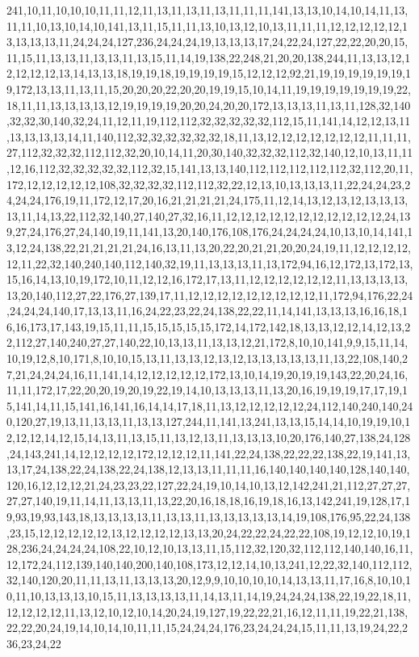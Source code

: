 241,10,11,10,10,10,11,11,12,11,13,11,13,11,13,11,11,11,141,13,13,10,14,10,14,11,13,11,11,10,13,10,14,10,141,13,11,15,11,11,13,10,13,12,10,13,11,11,11,12,12,12,12,12,13,13,13,13,11,24,24,24,127,236,24,24,24,19,13,13,13,17,24,22,24,127,22,22,20,20,15,11,15,11,13,13,11,13,13,11,13,15,11,14,19,138,22,248,21,20,20,138,244,11,13,13,12,12,12,12,12,13,14,13,13,18,19,19,18,19,19,19,19,15,12,12,12,92,21,19,19,19,19,19,19,19,172,13,13,11,13,11,15,20,20,20,22,20,20,19,19,15,10,14,11,19,19,19,19,19,19,19,22,18,11,11,13,13,13,13,12,19,19,19,19,20,20,24,20,20,172,13,13,13,11,13,11,128,32,140,32,32,30,140,32,24,11,12,11,19,112,112,32,32,32,32,32,112,15,11,141,14,12,12,13,11,13,13,13,13,14,11,140,112,32,32,32,32,32,32,18,11,13,12,12,12,12,12,12,12,11,11,11,27,112,32,32,32,112,112,32,20,10,14,11,20,30,140,32,32,32,112,32,140,12,10,13,11,11,12,16,112,32,32,32,32,32,112,32,15,141,13,13,140,112,112,112,112,112,32,112,20,11,172,12,12,12,12,12,108,32,32,32,32,112,112,32,22,12,13,10,13,13,13,11,22,24,24,23,24,24,24,176,19,11,172,12,17,20,16,21,21,21,21,24,175,11,12,14,13,12,13,12,13,13,13,13,11,14,13,22,112,32,140,27,140,27,32,16,11,12,12,12,12,12,12,12,12,12,12,12,24,139,27,24,176,27,24,140,19,11,141,13,20,140,176,108,176,24,24,24,24,10,13,10,14,141,13,12,24,138,22,21,21,21,21,24,16,13,11,13,20,22,20,21,21,20,20,24,19,11,12,12,12,12,12,11,22,32,140,240,140,112,140,32,19,11,13,13,13,11,13,172,94,16,12,172,13,172,13,15,16,14,13,10,19,172,10,11,12,12,16,172,17,13,11,12,12,12,12,12,12,11,13,13,13,13,13,20,140,112,27,22,176,27,139,17,11,12,12,12,12,12,12,12,12,12,11,172,94,176,22,24,24,24,24,140,17,13,13,11,16,24,22,23,22,24,138,22,22,11,14,141,13,13,13,16,16,18,16,16,173,17,143,19,15,11,11,15,15,15,15,15,172,14,172,142,18,13,13,12,12,14,12,13,22,112,27,140,240,27,27,140,22,10,13,13,11,13,13,12,21,172,8,10,10,141,9,9,15,11,14,10,19,12,8,10,171,8,10,10,15,13,11,13,13,12,13,12,13,13,13,13,13,11,13,22,108,140,27,21,24,24,24,16,11,141,14,12,12,12,12,12,172,13,10,14,19,20,19,19,143,22,20,24,16,11,11,172,17,22,20,20,19,20,19,22,19,14,10,13,13,13,11,13,20,16,19,19,19,17,17,19,15,141,14,11,15,141,16,141,16,14,14,17,18,11,13,12,12,12,12,12,24,112,140,240,140,240,120,27,19,13,11,13,13,11,13,13,127,244,11,141,13,241,13,13,15,14,14,10,19,19,10,12,12,12,14,12,15,14,13,11,13,15,11,13,12,13,11,13,13,13,10,20,176,140,27,138,24,128,24,143,241,14,12,12,12,12,172,12,12,12,11,141,22,24,138,22,22,22,138,22,19,141,13,13,17,24,138,22,24,138,22,24,138,12,13,13,11,11,11,16,140,140,140,140,128,140,140,120,16,12,12,12,21,24,23,23,22,127,22,24,19,10,14,10,13,12,142,241,21,112,27,27,27,27,27,140,19,11,14,11,13,13,11,13,22,20,16,18,18,16,19,18,16,13,142,241,19,128,17,19,93,19,93,143,18,13,13,13,13,11,13,13,11,13,13,13,13,13,14,19,108,176,95,22,24,138,23,15,12,12,12,12,12,13,12,12,12,12,13,13,20,24,22,22,24,22,22,108,19,12,12,10,19,128,236,24,24,24,24,108,22,10,12,10,13,13,11,15,112,32,120,32,112,112,140,140,16,11,12,172,24,112,139,140,140,200,140,108,173,12,12,14,10,13,241,12,22,32,140,112,112,32,140,120,20,11,11,13,11,13,13,13,20,12,9,9,10,10,10,10,14,13,13,11,17,16,8,10,10,10,11,10,13,13,13,10,15,11,13,13,13,13,11,14,13,11,14,19,24,24,24,138,22,19,22,18,11,12,12,12,12,11,13,12,10,12,10,14,20,24,19,127,19,22,22,21,16,12,11,11,19,22,21,138,22,22,20,24,19,14,10,14,10,11,11,15,24,24,24,176,23,24,24,24,15,11,11,13,19,24,22,236,23,24,22